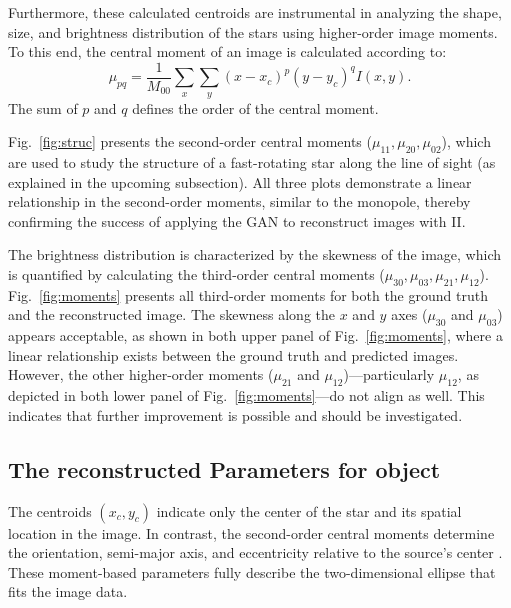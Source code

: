 Furthermore, these calculated centroids are instrumental in analyzing the shape, size, and brightness distribution of the stars using higher-order image moments. To this end, the central moment of an image is calculated according to:
\begin{equation}
	\mu_{pq} = \frac{1}{M_{00}}\sum_{x} \sum_{y} (x - x_c)^p (y - y_c)^q I(x, y).
\end{equation}
The sum of \(p\) and \(q\) defines the order of the central moment. 

Fig.~\ref{fig:struc} presents the second-order central moments (\(\mu_{11}, \mu_{20}, \mu_{02}\)), which are used to study the structure of a fast-rotating star along the line of sight (as explained in the upcoming subsection). All three plots demonstrate a linear relationship in the second-order moments, similar to the monopole, thereby confirming the success of applying the GAN to reconstruct images with II.

The brightness distribution is characterized by the skewness of the image, which is quantified by calculating the third-order central moments (\(\mu_{30}, \mu_{03}, \mu_{21}, \mu_{12}\)). Fig.~\ref{fig:moments} presents all third-order moments for both the ground truth and the reconstructed image. The skewness along the $x$ and $y$ axes (\(\mu_{30}\) and \(\mu_{03}\)) appears acceptable, as shown in both upper panel of Fig.~\ref{fig:moments}, where a linear relationship exists between the ground truth and predicted images. However, the other higher-order moments (\(\mu_{21}\) and \(\mu_{12}\))—particularly \(\mu_{12}\), as depicted in both lower panel of Fig.~\ref{fig:moments}—do not align as well. This indicates that further improvement is possible and should be investigated.

\subsection{The reconstructed Parameters for object}
The centroids \((x_c, y_c)\) indicate only the center of the star and its spatial location in the image. In contrast, the second-order central moments determine the orientation, semi-major axis, and eccentricity relative to the source's center \citep{teague1980image}. These moment-based parameters fully describe the two-dimensional ellipse that fits the image data.


